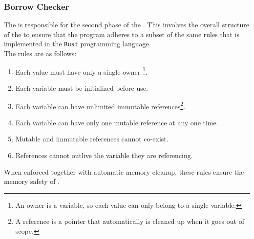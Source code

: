 \subsubsection{Borrow Checker}

The \borrowChecker{} is responsible for the second phase of the \static. 
This involves the overall structure of the \ast{} to ensure that the program
adheres to a subset of the same rules that is implemented in the \texttt{Rust} programming
language\cite{RUST}. \\

The rules are as follows:

\begin{enumerate} 
  \item Each value must have only a single owner \footnote{An owner is a variable, so
    each value can only belong to a single variable.}. 
  
  \item Each variable must be initialized before use. 

  \item Each variable can have unlimited immutable references\footnote{A reference is
    a pointer that automatically is cleaned up when it goes out of scope.}.

  \item Each variable can have only one mutable reference at any one time. 

  \item Mutable and immutable references cannot co-exist. 

  \item References cannot outlive the variable they are referencing.
\end{enumerate}

When enforced together with automatic memory cleanup, these rules ensure the memory
safety of \lang. 
